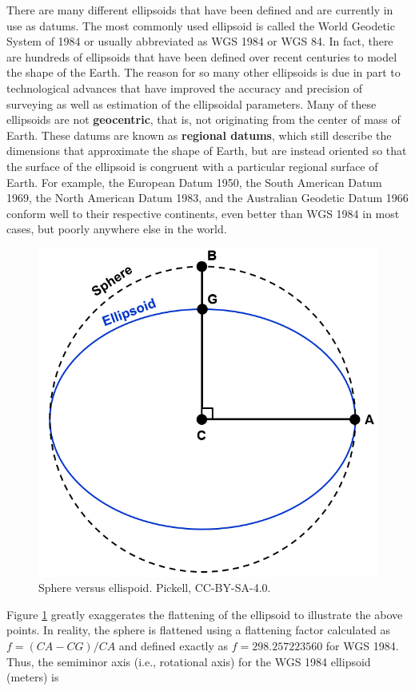 \documentclass[
]{book}
\begin{document}
There are many different ellipsoids that have been defined and are currently in use as datums. The most commonly used ellipsoid is called the World Geodetic System of 1984 or usually abbreviated as WGS 1984 or WGS 84. In fact, there are hundreds of ellipsoids that have been defined over recent centuries to model the shape of the Earth. The reason for so many other ellipsoids is due in part to technological advances that have improved the accuracy and precision of surveying as well as estimation of the ellipsoidal parameters. Many of these ellipsoids are not \textbf{geocentric}, that is, not originating from the center of mass of Earth. These datums are known as \textbf{regional datums}, which still describe the dimensions that approximate the shape of Earth, but are instead oriented so that the surface of the ellipsoid is congruent with a particular regional surface of Earth. For example, the European Datum 1950, the South American Datum 1969, the North American Datum 1983, and the Australian Geodetic Datum 1966 conform well to their respective continents, even better than WGS 1984 in most cases, but poorly anywhere else in the world.

\begin{figure}
\includegraphics[width=0.75\linewidth]{images/02-sphere-ellipsoid} \caption{Sphere versus ellispoid. Pickell, CC-BY-SA-4.0.}\label{fig:2-sphere-ellipsoid}
\end{figure}

Figure \ref{fig:2-sphere-ellipsoid} greatly exaggerates the flattening of the ellipsoid to illustrate the above points. In reality, the sphere is flattened using a flattening factor calculated as \(f=(CA-CG)/CA\) and defined exactly as \(f=298.257223560\) for WGS 1984. Thus, the semiminor axis (i.e., rotational axis) for the WGS 1984 ellipsoid (meters) is
\end{document}
